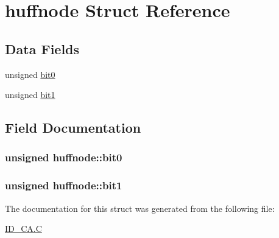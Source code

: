 \hypertarget{structhuffnode}{
\section{huffnode Struct Reference}
\label{structhuffnode}
}
\subsection*{Data Fields}
\begin{DoxyCompactItemize}
\item 
unsigned \hyperlink{structhuffnode_abba0d77bc4dc1d3b3bea9a59b9e111f7}{bit0}
\item 
unsigned \hyperlink{structhuffnode_a6cea93ea221079abd3c525aea688c189}{bit1}
\end{DoxyCompactItemize}


\subsection{Field Documentation}
\hypertarget{structhuffnode_abba0d77bc4dc1d3b3bea9a59b9e111f7}{
\subsubsection[{bit0}]{\setlength{\rightskip}{0pt plus 5cm}unsigned {\bf huffnode::bit0}}}
\label{structhuffnode_abba0d77bc4dc1d3b3bea9a59b9e111f7}
\hypertarget{structhuffnode_a6cea93ea221079abd3c525aea688c189}{
\subsubsection[{bit1}]{\setlength{\rightskip}{0pt plus 5cm}unsigned {\bf huffnode::bit1}}}
\label{structhuffnode_a6cea93ea221079abd3c525aea688c189}


The documentation for this struct was generated from the following file:\begin{DoxyCompactItemize}
\item 
\hyperlink{ID__CA_8C}{ID\_\-CA.C}\end{DoxyCompactItemize}
